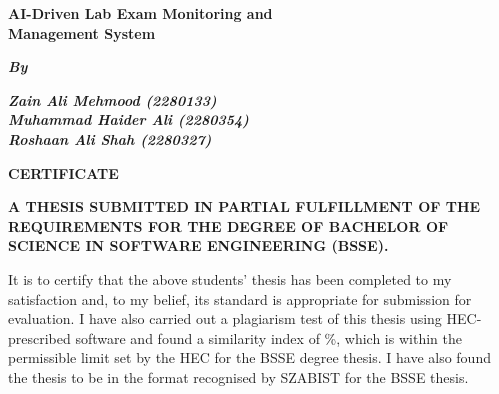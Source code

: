 \singlespacing
\newpage
\thispagestyle{empty}

\begin{center}
\vspace*{0.8cm}

{\bfseries\fontsize{20}{24}\selectfont 
AI-Driven Lab Exam Monitoring and\\
Management System\par}

\vspace{0.8cm}

{\bfseries\itshape\fontsize{16}{18}\selectfont By\par}

\vspace{0.5cm}

{\bfseries\itshape\fontsize{14}{16}\selectfont
Zain Ali Mehmood (2280133)\\
Muhammad Haider Ali (2280354)\\
Roshaan Ali Shah (2280327)\par}

\vspace{0.8cm}

{\bfseries\fontsize{22}{26}\selectfont CERTIFICATE\par}

\end{center}

\vspace{0.6cm}

\begin{center}
{\bfseries\fontsize{11}{14}\selectfont
A THESIS SUBMITTED IN PARTIAL FULFILLMENT OF THE REQUIREMENTS FOR THE DEGREE OF BACHELOR OF SCIENCE IN SOFTWARE ENGINEERING (BSSE).\par}
\end{center}

\vspace{0.6cm}

{\fontsize{12.5}{14}\selectfont
It is to certify that the above students' thesis has been completed to my satisfaction and, to my belief, its standard is appropriate for submission for evaluation. I have also carried out a plagiarism test of this thesis using HEC-prescribed software and found a similarity index of \underline{\hspace{1.5cm}}\%, which is within the permissible limit set by the HEC for the BSSE degree thesis. I have also found the thesis to be in the format recognised by SZABIST for the BSSE thesis.
}

\vspace{1.5cm}

